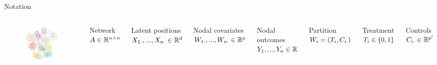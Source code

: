 \documentclass{beamer}
\theoremstyle{remark}
\begin{document}
\begin{frame}{Notation}
    \begin{columns}

        \begin{figure}
            \includegraphics[width=\textwidth]{figures/assortative.png}
        \end{figure}


        Network $A \in \mathbb{R}^{n \times n}$

        Latent positions $X_{1 \cdot}, ..., X_{n \cdot} \in \mathbb{R}^d$

        Nodal covariates $W_{1 \cdot}, ..., W_{n \cdot} \in \mathbb{R}^{p}$

        Nodal outcomes $Y_1, ..., Y_n \in \mathbb{R}$

        \vspace{6mm}

        Partition $W_i = (T_i, C_{i \cdot})$

        Treatment $T_i \in \{0, 1\}$

        Controls $C_{i \cdot} \in \mathbb{R}^{p'}$

    \end{columns}
\end{frame}
\end{document}
